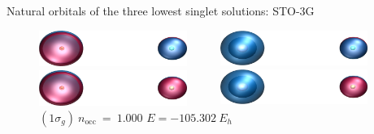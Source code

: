 \documentclass[10pt]{beamer}
\begin{document}
\begin{frame}{Natural orbitals of the three lowest singlet solutions:  STO-3G}
  \begin{figure}
    \begin{columns}[b]
      
      \begin{column}{0.31\textwidth}
        \includegraphics[width=0.9\textwidth]{Figures/lifr12_gs_mo7.cube.png}
        \caption*{\centering $(2\sigma_g)~n_\text{occ}~=~1.000$}
        \includegraphics[width=0.9\textwidth]{Figures/lifr12_gs_mo6.cube.png}
        \caption*{\centering $(1\sigma_g)~n_\text{occ}~=~1.000$
        $E=-105.217~E_h$}
      \end{column}

      \begin{column}{0.31\textwidth}
        \includegraphics[width=0.9\textwidth]{Figures/lifr12_s1_mo7.cube.png}
        \caption*{\centering $(1\sigma_u)~n_\text{occ}~=~1.000$}
        \includegraphics[width=0.9\textwidth]{Figures/lifr12_s1_mo6.cube.png}
        \caption*{\centering $(1\sigma_g)~n_\text{occ}~=~1.000$
        $E=-105.302~E_h$}
      \end{column}


\end{columns}
\end{figure}
\end{frame}
\end{document}
